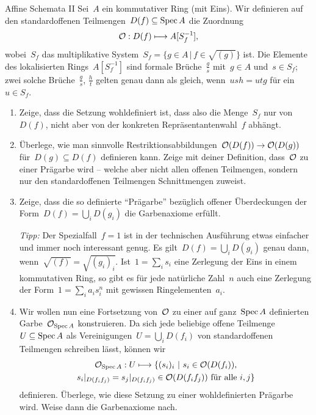 \documentclass{uebblatt}
\begin{document}
\begin{aufgabe}{Affine Schemata II}
Sei~$A$ ein kommutativer Ring (mit Eins). Wir definieren auf den
standardoffenen Teilmengen~$D(f) \subseteq \operatorname{Spec} A$ die Zuordnung
\[ \mathcal{O} : D(f) \longmapsto A[S_f^{-1}], \]
wobei~$S_f$ das multiplikative System~$S_f = \{ g \in A \,|\, f \in \sqrt{(g)}
\}$ ist. Die Elemente des lokalisierten Rings~$A[S_f^{-1}]$
sind formale Brüche~$\frac{g}{s}$ mit~$g \in A$ und~$s \in S_f$; zwei solche
Brüche~$\frac{g}{s}$, $\frac{h}{t}$ gelten genau dann als gleich, wenn~$ush =
utg$ für ein~$u \in S_f$.

\begin{enumerate}
\item Zeige, dass die Setzung wohldefiniert ist, dass also die Menge~$S_f$ nur
von~$D(f)$, nicht aber von der konkreten Repräsentantenwahl~$f$ abhängt.

\item Überlege, wie man sinnvolle Restriktionsabbildungen~$\mathcal{O}(D(f)) \to
\mathcal{O}(D(g))$ für~$D(g) \subseteq D(f)$ definieren kann. Zeige mit deiner
Definition, dass~$\mathcal{O}$ zu einer Prägarbe wird -- welche aber nicht allen offenen
Teilmengen, sondern nur den standardoffenen Teilmengen Schnittmengen zuweist.
\item Zeige, dass die so definierte "`Prägarbe"' bezüglich offener
Überdeckungen der Form~$D(f) = \bigcup_i D(g_i)$ die Garbenaxiome erfüllt.

{\tiny
\emph{Tipp:} Der Spezialfall~$f = 1$ ist in der technischen Ausführung etwas
einfacher und immer noch interessant genug. Es gilt~$D(f) = \bigcup_i D(g_i)$
genau dann, wenn~$\sqrt{(f)} = \sqrt{(g_i)_i}$. Ist~$1 = \sum_i s_i$ eine Zerlegung
der Eins in einem kommutativen Ring, so gibt es für jede natürliche Zahl~$n$
auch eine Zerlegung der Form~$1 = \sum_i a_i s_i^n$ mit gewissen
Ringelementen~$a_i$.\par}

\item Wir wollen nun eine Fortsetzung von~$\mathcal{O}$ zu einer auf ganz~$\operatorname{Spec} A$
definierten Garbe~$\mathcal{O}_{\operatorname{Spec} A}$ konstruieren. Da sich jede beliebige offene
Teilmenge~$U \subseteq \operatorname{Spec} A$ als Vereinigungen~$U = \bigcup_i D(f_i)$ von
standardoffenen Teilmengen schreiben lässt, können wir
\begin{multline*}
  \mathcal{O}_{\operatorname{Spec} A} : U \longmapsto \{ (s_i)_i \ |\
  \text{$s_i \in \mathcal{O}(D(f_i))$,} \\
  \text{$s_i|_{D(f_i f_j)} = s_j|_{D(f_i f_j)} \in \mathcal{O}(D(f_if_j))$ für alle~$i,j$} \}
\end{multline*}
definieren. Überlege, wie diese Setzung zu einer wohldefinierten Prägarbe wird.
Weise dann die Garbenaxiome nach.


\end{enumerate}
\end{aufgabe}
\end{document}
